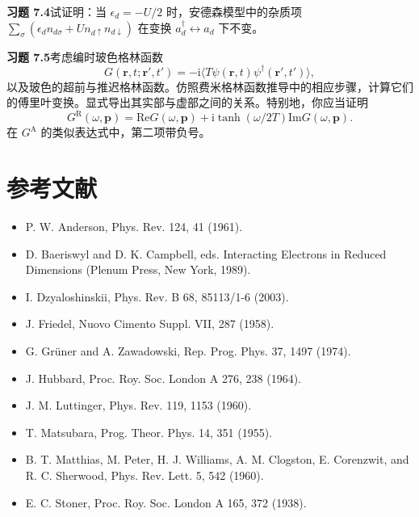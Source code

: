 \textbf{习题 7.4}\quad 试证明：当 $\epsilon_{d} = -U/2$ 时，安德森模型中的杂质项 $\sum_{\sigma}\left(\epsilon_{d}n_{d\sigma} + Un_{d\uparrow}n_{d\downarrow}\right)$ 在变换 $a^{\dagger}_{d} \leftrightarrow a_{d}$ 下不变。

\textbf{习题 7.5}\quad 考虑编时玻色格林函数
\begin{equation*}
G(\mathbf{r},t;\mathbf{r}',t') = -\mathrm{i}\langle T\psi(\mathbf{r},t)\psi^{\dagger}(\mathbf{r}',t')\rangle,
\tag{7.142}
\end{equation*}
以及玻色的超前与推迟格林函数。仿照费米格林函数推导中的相应步骤，计算它们的傅里叶变换。显式导出其实部与虚部之间的关系。特别地，你应当证明
\begin{equation*}
G^{\mathrm{R}}(\omega,\mathbf{p}) = \mathrm{Re}G(\omega,\mathbf{p}) + \mathrm{i}\tanh(\omega/2T)\mathrm{Im}G(\omega,\mathbf{p}).
\tag{7.143}
\end{equation*}
在 $G^{\mathrm{A}}$ 的类似表达式中，第二项带负号。

\section*{参考文献}

\begin{itemize}[leftmargin=2em,itemsep=0pt,parsep=0pt,label={}]
\item [A1961] P. W. Anderson, Phys. Rev. 124, 41 (1961).
\item [BC1989] D. Baeriswyl and D. K. Campbell, eds. Interacting Electrons in Reduced Dimensions (Plenum Press, New York, 1989).
\item [D2003] I. Dzyaloshinskii, Phys. Rev. B 68, 85113/1-6 (2003).
\item [F1958] J. Friedel, Nuovo Cimento Suppl. VII, 287 (1958).
\item [GZ1974] G. Grüner and A. Zawadowski, Rep. Prog. Phys. 37, 1497 (1974).
\item [H1964] J. Hubbard, Proc. Roy. Soc. London A 276, 238 (1964).
\item [L1960] J. M. Luttinger, Phys. Rev. 119, 1153 (1960).
\item [M1955] T. Matsubara, Prog. Theor. Phys. 14, 351 (1955).
\item [M1960] B. T. Matthias, M. Peter, H. J. Williams, A. M. Clogston, E. Corenzwit, and R. C. Sherwood, Phys. Rev. Lett. 5, 542 (1960).
\item [S1938] E. C. Stoner, Proc. Roy. Soc. London A 165, 372 (1938).
\end{itemize}
